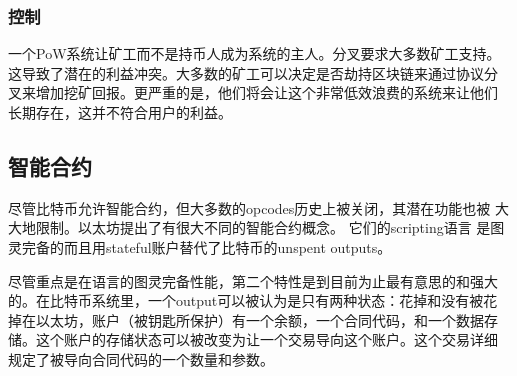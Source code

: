 \documentclass[letterpaper]{article}
\begin{document}
\subsubsection{控制}
一个PoW系统让矿工而不是持币人成为系统的主人。分叉要求大多数矿工支持。
这导致了潜在的利益冲突。大多数的矿工可以决定是否劫持区块链来通过协议分
叉来增加挖矿回报。更严重的是，他们将会让这个非常低效浪费的系统来让他们
长期存在，这并不符合用户的利益。

\subsection{智能合约}
尽管比特币允许智能合约，但大多数的opcodes历史上被关闭，其潜在功能也被
大大地限制。以太坊提出了有很大不同的智能合约概念。 它们的scripting语言
是图灵完备的而且用stateful账户替代了比特币的unspent outputs。

尽管重点是在语言的图灵完备性能，第二个特性是到目前为止最有意思的和强大
的。在比特币系统里，一个output可以被认为是只有两种状态：花掉和没有被花
掉在以太坊，账户（被钥匙所保护）有一个余额，一个合同代码，和一个数据存
储。这个账户的存储状态可以被改变为让一个交易导向这个账户。这个交易详细
规定了被导向合同代码的一个数量和参数。
\end{document}
